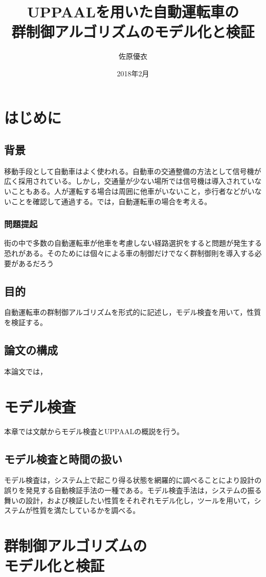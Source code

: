 \documentclass{tpu-sotu}
\title{UPPAALを用いた自動運転車の\\群制御アルゴリズムのモデル化と検証}
\author{佐原優衣}
\date{2018年2月}
\begin{document}
\maketitle
\clearpage
{}
\setcounter{tocdepth}{3}
\tableofcontents
\clearpage
{}

\chapter{はじめに}
	\section{背景}
	移動手段として自動車はよく使われる。自動車の交通整備の方法として信号機が広く採用されている。しかし，交通量が少ない場所では信号機は導入されていないこともある。人が運転する場合は周囲に他車がいないこと，歩行者などがいないことを確認して通過する。では，自動運転車の場合を考える。
		\subsection{問題提起}
		街の中で多数の自動運転車が他車を考慮しない経路選択をすると問題が発生する恐れがある。そのためには個々による車の制御だけでなく群制御則を導入する必要があるだろう
	\section{目的}
	自動運転車の群制御アルゴリズムを形式的に記述し，モデル検査を用いて，性質を検証する。
	\section{論文の構成}
	本論文では，
\chapter{モデル検査}
本章では文献\cite{a1}からモデル検査とUPPAALの概説を行う。
	\section{モデル検査と時間の扱い}
	モデル検査は，システム上で起こり得る状態を網羅的に調べることにより設計の誤りを発見する自動検証手法の一種である。モデル検査手法は，システムの振る舞いの設計，および検証したい性質をそれぞれモデル化し，ツールを用いて，システムが性質を満たしているかを調べる。
\chapter{群制御アルゴリズムの\\モデル化と検証}
\end{document}
